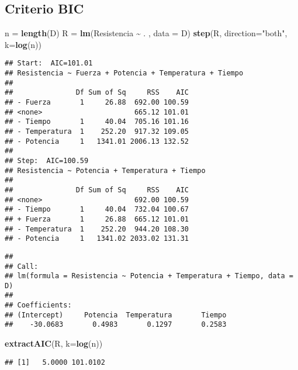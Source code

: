 \documentclass[
]{article}
\newenvironment{Shaded}{\begin{snugshade}}{\end{snugshade}}
\newcommand{\AttributeTok}[1]{\textcolor[rgb]{0.13,0.29,0.53}{#1}}
\newcommand{\FunctionTok}[1]{\textcolor[rgb]{0.13,0.29,0.53}{\textbf{#1}}}
\newcommand{\NormalTok}[1]{#1}
\newcommand{\OtherTok}[1]{\textcolor[rgb]{0.56,0.35,0.01}{#1}}
\newcommand{\SpecialCharTok}[1]{\textcolor[rgb]{0.81,0.36,0.00}{\textbf{#1}}}
\newcommand{\StringTok}[1]{\textcolor[rgb]{0.31,0.60,0.02}{#1}}
\begin{document}
\subsection{Criterio BIC}\label{criterio-bic}

\begin{Shaded}
\begin{Highlighting}[]
\NormalTok{n }\OtherTok{=} \FunctionTok{length}\NormalTok{(D)}
\NormalTok{R }\OtherTok{=} \FunctionTok{lm}\NormalTok{(Resistencia }\SpecialCharTok{\textasciitilde{}}\NormalTok{ . , }\AttributeTok{data =}\NormalTok{ D)}
\FunctionTok{step}\NormalTok{(R, }\AttributeTok{direction=}\StringTok{"both"}\NormalTok{, }\AttributeTok{k=}\FunctionTok{log}\NormalTok{(n))}
\end{Highlighting}
\end{Shaded}

\begin{verbatim}
## Start:  AIC=101.01
## Resistencia ~ Fuerza + Potencia + Temperatura + Tiempo
## 
##               Df Sum of Sq     RSS    AIC
## - Fuerza       1     26.88  692.00 100.59
## <none>                      665.12 101.01
## - Tiempo       1     40.04  705.16 101.16
## - Temperatura  1    252.20  917.32 109.05
## - Potencia     1   1341.01 2006.13 132.52
## 
## Step:  AIC=100.59
## Resistencia ~ Potencia + Temperatura + Tiempo
## 
##               Df Sum of Sq     RSS    AIC
## <none>                      692.00 100.59
## - Tiempo       1     40.04  732.04 100.67
## + Fuerza       1     26.88  665.12 101.01
## - Temperatura  1    252.20  944.20 108.30
## - Potencia     1   1341.02 2033.02 131.31
\end{verbatim}

\begin{verbatim}
## 
## Call:
## lm(formula = Resistencia ~ Potencia + Temperatura + Tiempo, data = D)
## 
## Coefficients:
## (Intercept)     Potencia  Temperatura       Tiempo  
##    -30.0683       0.4983       0.1297       0.2583
\end{verbatim}

\begin{Shaded}
\begin{Highlighting}[]
\FunctionTok{extractAIC}\NormalTok{(R, }\AttributeTok{k=}\FunctionTok{log}\NormalTok{(n))}
\end{Highlighting}
\end{Shaded}

\begin{verbatim}
## [1]   5.0000 101.0102
\end{verbatim}
\end{document}
